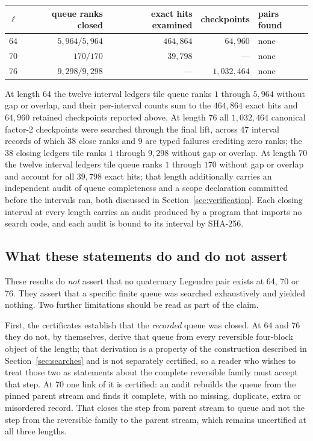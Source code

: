 \documentclass[11pt]{article}
\begin{document}
\begin{center}
\small
\begin{tabular}{@{}rrrrl@{}}
\toprule
$\ell$ & queue ranks closed & exact hits examined & checkpoints & pairs found\\
\midrule
64 & $5{,}964/5{,}964$ & $464{,}864$ & $64{,}960$ & none\\
70 & $170/170$ & $39{,}798$ & --- & none\\
76 & $9{,}298/9{,}298$ & --- & $1{,}032{,}464$ & none\\
\bottomrule
\end{tabular}
\end{center}

At length 64 the twelve interval ledgers tile queue ranks $1$ through $5{,}964$
without gap or overlap, and their per-interval counts sum to the $464{,}864$
exact hits and $64{,}960$ retained checkpoints reported above.  At length 76
all $1{,}032{,}464$ canonical factor-2 checkpoints were searched through the
final lift, across 47 interval records of which 38 close ranks and 9 are typed
failures crediting zero ranks; the 38 closing ledgers tile ranks $1$ through
$9{,}298$ without gap or overlap.  At length 70 the twelve interval ledgers
tile queue ranks $1$ through $170$ without gap or overlap and account for all
$39{,}798$ exact hits; that length additionally carries an independent audit of
queue completeness and a scope declaration committed before the intervals ran,
both discussed in Section~\ref{sec:verification}.  Each closing interval at
every length carries an audit produced by a program that imports no search
code, and each audit is bound to its interval by SHA-256.

\subsection*{What these statements do and do not assert}

These results do \emph{not} assert that no quaternary Legendre pair exists at
64, 70 or 76.  They assert that a specific finite queue was searched
exhaustively and yielded nothing.  Two further limitations should be read as
part of the claim.

First, the certificates establish that the \emph{recorded} queue was closed.
At 64 and 76 they do not, by themselves, derive that queue from every
reversible four-block object of the length; that derivation is a property of
the construction described in Section~\ref{sec:searches} and is not separately
certified, so a reader who wishes to treat those two as statements about the
complete reversible family must accept that step.  At 70 one link of it is
certified: an audit rebuilds the queue from the pinned parent stream and finds
it complete, with no missing, duplicate, extra or misordered record.  That
closes the step from parent stream to queue and not the step from the
reversible family to the parent stream, which remains uncertified at all three
lengths.
\end{document}
